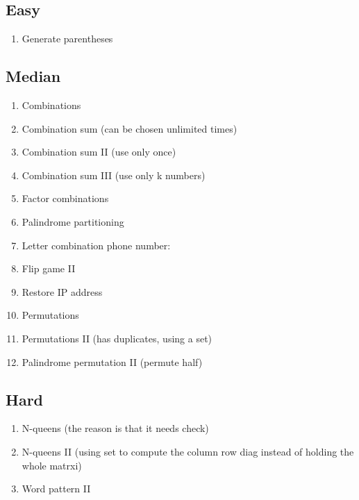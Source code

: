 \documentclass[DIV=calc, paper=a4, fontsize=11pt, twocolumn]{scrartcl}	 %
\begin{document}
\subsection*{Easy}
\begin{enumerate}
\item Generate parentheses
\end{enumerate}

\subsection*{Median}
\begin{enumerate}
\item Combinations \cite{077}
\item Combination sum (can be chosen unlimited times) \cite{039}
\item Combination sum II (use only once) \cite{040}
\item Combination sum III (use only k numbers) \cite{216}
\item Factor combinations \cite{254}
\item Palindrome partitioning \cite{131}
\item Letter combination phone number: \cite{017} 
\item {\color{red} Flip game II} \cite{293} 
\item Restore IP address \cite{093}
\item Permutations \cite{046} 
\item Permutations II (has duplicates, using a set)
\item Palindrome permutation II (permute half)
\end{enumerate}

\subsection*{Hard}
\begin{enumerate}
\item N-queens (the reason is that it needs check)
\item N-queens II (using set to compute the column row diag instead of holding the whole matrxi)
\item Word pattern II
\end{enumerate}

\end{document}
